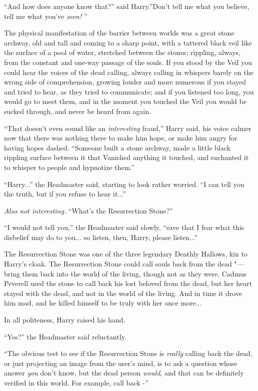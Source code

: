 ``And how does anyone know that?'' said Harry.''Don't tell me what you
believe, tell me what you've \emph{seen!} ''

The physical manifestation of the barrier between worlds was a great
stone archway, old and tall and coming to a sharp point, with a tattered
black veil like the surface of a pool of water, stretched between the
stones; rippling, always, from the constant and one-way passage of the
souls. If you stood by the Veil you could hear the voices of the dead
calling, always calling in whispers barely on the wrong side of
comprehension, growing louder and more numerous if you stayed and tried
to hear, as they tried to communicate; and if you listened too long, you
would go to meet them, and in the moment you touched the Veil you would
be sucked through, and never be heard from again.

``That doesn't even sound like an \emph{interesting} fraud,'' Harry said,
his voice calmer now that there was nothing there to make him hope, or
make him angry for having hopes dashed. ``Someone built a stone archway,
made a little black rippling surface between it that Vanished anything
it touched, and enchanted it to whisper to people and hypnotize them.''

``Harry...'' the Headmaster said, starting to look rather worried.
``I can tell you the truth, but if you refuse to hear it...''

\emph{Also not interesting.} ``What's the Resurrection Stone?''

``I would not tell you,'' the Headmaster said slowly, ``save that I fear
what this disbelief may do to you... so listen, then, Harry, please
listen...''

The Resurrection Stone was one of the three legendary Deathly Hallows,
kin to Harry's cloak. The Resurrection Stone could call souls back from
the dead "--- bring them back into the world of the living, though not as
they were. Cadmus Peverell used the stone to call back his lost beloved
from the dead, but her heart stayed with the dead, and not in the world
of the living. And in time it drove him mad, and he killed himself to be
truly with her once more...

In all politeness, Harry raised his hand.

``Yes?'' the Headmaster said reluctantly.

``The obvious test to see if the Resurrection Stone is \emph{really}
calling back the dead, or just projecting an image from the user's mind,
is to ask a question whose answer \emph{you} don't know, but the dead
person \emph{would}, and that can be definitely verified in this world.
For example, call back -''

